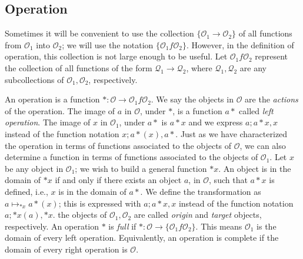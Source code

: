 \documentclass [12pt]{book}
\begin{document}
		\subsection{Operation}

Sometimes it will be convenient to use the collection $\{\mathcal O_1\rightarrow\mathcal O_2\}$ of all functions from $\mathcal O_1$ into $\mathcal O_2$; we will use the notation $\{\mathcal O_1f\mathcal O_2\}$. However, in the definition of operation, this collection is not large enough to be useful. Let $\mathcal O_1f\mathcal O_2$ represent the collection of all functions of the form $\mathcal{Q}_1\rightarrow\mathcal{Q}_2$, where $\mathcal{Q}_1,\mathcal{Q}_2$ are any subcollections of $\mathcal{O}_1,\mathcal{O}_2$, respectively. 

An operation is a function $*:\mathcal{O}\rightarrow\mathcal{O}_{1}f\mathcal{O}_{2}$. We say the objects in $\mathcal O$ are the \textit{actions} of the operation. The image of $a$ in $\mathcal O$, under $*$, is a function $a*$ called \textit{left operation}. The image of $x$ in $\mathcal O_1$, under $a*$ is $a*x$ and we express $a;a*x,x$ instead of the function notation $x;a*(x),a*$. Just as we have characterized the operation in terms of functions associated to the objects of $\mathcal O$, we can also determine a function in terms of functions associated to the objects of $\mathcal O_1$. Let $x$ be any object in $\mathcal O_1$; we wish to build a general function $*x$. An object is in the domain of $*x$ if and only if there exists an object $a$, in $\mathcal O$, such that $a*x$ is defined, i.e., $x$ is in the domain of $a*$. We define the transformation as $a\mapsto_{*x}a*(x)$; this is expressed with $a;a*x,x$ instead of the function notation $a;*x(a),*x$. the objects of $\mathcal O_1,\mathcal O_2$ are called \textit{origin} and \textit{target} objects, respectively. An operation $*$ is \textit{full} if $*:\mathcal O\rightarrow\{\mathcal{O}_{1}f\mathcal{O}_{2}\}$. This means $\mathcal O_1$ is  the domain of every left operation. Equivalently, an operation is complete if the domain of every right operation is $\mathcal O$. 
\end{document}
